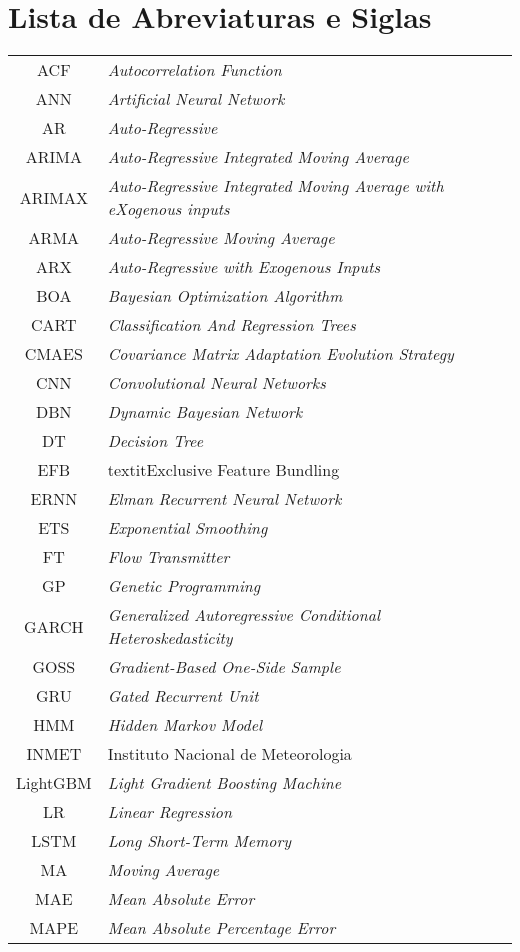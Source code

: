 \newpage
{}
\section*{Lista de Abreviaturas e Siglas}



\begin{tabular}{cp{}}
	ACF & \textit{Autocorrelation Function}\\
	ANN & \textit{Artificial Neural Network} \\
	AR & \textit{Auto-Regressive}\\
	ARIMA & \textit{Auto-Regressive Integrated Moving Average} \\
	ARIMAX & \textit{Auto-Regressive Integrated Moving Average with eXogenous inputs}\\
	ARMA & \textit{Auto-Regressive Moving Average} \\
	ARX & \textit{Auto-Regressive with Exogenous Inputs}\\
	BOA & \textit{Bayesian Optimization Algorithm}\\
	CART & \textit{Classification And Regression Trees} \\
	CMAES & \textit{Covariance Matrix Adaptation Evolution Strategy}\\
	CNN & \textit{Convolutional Neural Networks}\\
	DBN & \textit{Dynamic Bayesian Network} \\
	DT & \textit{Decision Tree} \\
	EFB & textit{Exclusive Feature Bundling}\\
	ERNN & \textit{Elman Recurrent Neural Network} \\
	ETS & \textit{Exponential Smoothing} \\
	FT & \textit{Flow Transmitter}\\
	GP & \textit{Genetic Programming}\\
	GARCH & \textit{Generalized Autoregressive Conditional Heteroskedasticity}\\
	GOSS & \textit{Gradient-Based One-Side Sample}\\
	GRU & \textit{Gated Recurrent Unit} \\
	HMM & \textit{Hidden Markov Model}\\
	INMET & Instituto Nacional de Meteorologia\\
	LightGBM & \textit{Light Gradient Boosting Machine} \\
	LR & \textit{Linear Regression}\\
	LSTM &\textit{Long Short-Term Memory}	\\
	MA & \textit{Moving Average}\\
	MAE & \textit{Mean Absolute Error}\\
	MAPE & \textit{Mean Absolute Percentage Error}\\
\end{tabular}

